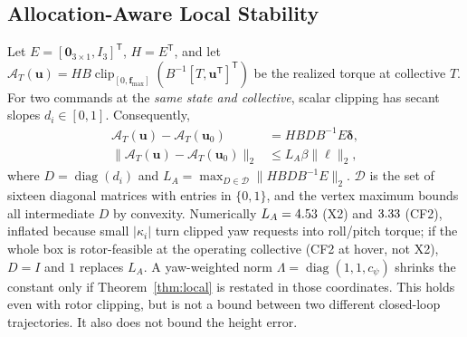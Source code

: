 \documentclass[letterpaper, 10 pt, conference]{ieeeconf}
\newcommand{\T}{^{\mathsf T}}
\newcommand{\clip}{\operatorname{clip}}
\begin{document}
\subsection{Allocation-Aware Local Stability}
\label{sec:local}
Let $E=[\bm0_{3\times1},I_3]\T$, $H=E\T$, and let
$\mathcal A_T(\bm u)=HB\clip_{[0,\bm f_{\max}]}(B^{-1}[T,\bm u\T]\T)$
be the realized torque at collective $T$. For two commands at the
\emph{same state and collective}, scalar clipping has secant slopes
$d_i\in[0,1]$. Consequently,
\begin{align}
 \mathcal A_T(\bm u)-\mathcal A_T(\bm u_0)
 &=HBDB^{-1}E\bm\delta,\\
 \|\mathcal A_T(\bm u)-\mathcal A_T(\bm u_0)\|_2
 &\le L_A\beta\|\bm\ell\|_2,
 \label{eq:allocbound}
\end{align}
where $D=\operatorname{diag}(d_i)$ and
$L_A=\max_{D\in\mathcal D}\|HBDB^{-1}E\|_2$.
$\mathcal D$ is the set of sixteen diagonal matrices with entries in $\{0,1\}$, and the vertex
maximum bounds all intermediate $D$ by convexity. Numerically $L_A=4.53$ (X2) and
$3.33$ (CF2), inflated because small $|\kappa_i|$ turn clipped yaw requests into roll/pitch
torque; if the whole box is rotor-feasible at the operating collective (CF2 at hover, not X2),
$D=I$ and $1$ replaces $L_A$. A yaw-weighted norm $\Lambda=\operatorname{diag}(1,1,c_\psi)$
shrinks the constant only if Theorem~\ref{thm:local} is restated in those coordinates.
This holds even with rotor clipping, but is not a bound between two
different closed-loop trajectories. It also does not bound the height error.
\end{document}
